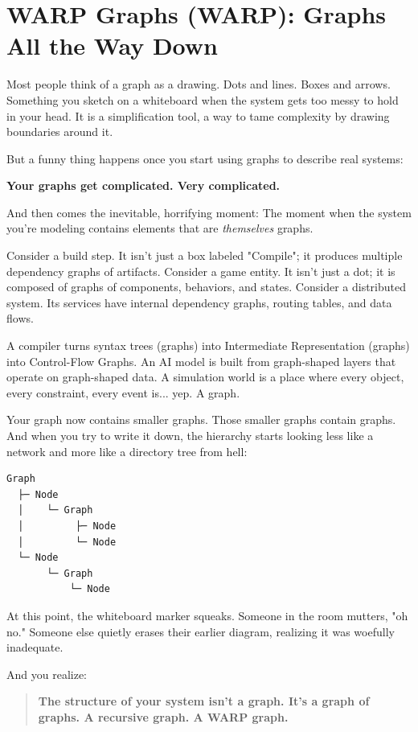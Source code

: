 \chapter{WARP Graphs (WARP): Graphs All the Way Down}
\label{chap:warp-graphs-all-the-way-down}

Most people think of a graph as a drawing. Dots and lines. Boxes and arrows. Something you sketch on a whiteboard when the system gets too messy to hold in your head. It is a simplification tool, a way to tame complexity by drawing boundaries around it.

But a funny thing happens once you start using graphs to describe real systems:

\textbf{Your graphs get complicated. Very complicated.}

And then comes the inevitable, horrifying moment: The moment when the system you're modeling contains elements that are \textit{themselves} graphs.

Consider a build step. It isn't just a box labeled "Compile"; it produces multiple dependency graphs of artifacts. Consider a game entity. It isn't just a dot; it is composed of graphs of components, behaviors, and states. Consider a distributed system. Its services have internal dependency graphs, routing tables, and data flows.

A compiler turns syntax trees (graphs) into Intermediate Representation (graphs) into Control-Flow Graphs. An AI model is built from graph-shaped layers that operate on graph-shaped data. A simulation world is a place where every object, every constraint, every event is... yep. A graph.

Your graph now contains smaller graphs. Those smaller graphs contain graphs. And when you try to write it down, the hierarchy starts looking less like a network and more like a directory tree from hell:

\begin{lstlisting}[language=bash]
Graph
  ├─ Node
  │    └─ Graph
  │         ├─ Node
  │         └─ Node
  └─ Node
       └─ Graph
           └─ Node
\end{lstlisting}

At this point, the whiteboard marker squeaks. Someone in the room mutters, "oh no." Someone else quietly erases their earlier diagram, realizing it was woefully inadequate.

And you realize:

\begin{quote}
\textbf{The structure of your system isn't a graph. It's a graph of graphs. A recursive graph. A WARP graph.}
\end{quote}

